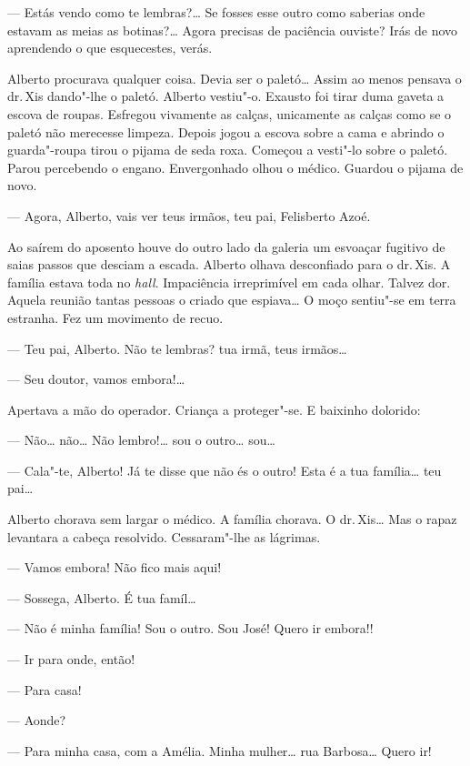 \begin{linenumbers}
--- Estás vendo como te lembras?\ldots{} Se fosses esse outro como saberias
onde estavam as meias as botinas?\ldots{} Agora precisas de paciência
ouviste? Irás de novo aprendendo o que esquecestes, verás.

Alberto procurava qualquer coisa. Devia ser o paletó\ldots{} Assim ao menos
pensava o dr.\,Xis dando"-lhe o paletó. Alberto vestiu"-o. Exausto foi
tirar duma gaveta a escova de roupas. Esfregou vivamente as calças,
unicamente as calças como se o paletó não merecesse limpeza. Depois
jogou a escova sobre a cama e abrindo o guarda"-roupa tirou o pijama de
seda roxa. Começou a vesti"-lo sobre o paletó. Parou percebendo o engano.
Envergonhado olhou o médico. Guardou o pijama de novo.

--- Agora, Alberto, vais ver teus irmãos, teu pai, Felisberto Azoé.

Ao saírem do aposento houve do outro lado da galeria um esvoaçar
fugitivo de saias passos que desciam a escada. Alberto olhava
desconfiado para o dr.\,Xis. A família estava toda no \emph{hall}.
Impaciência irreprimível em cada olhar. Talvez dor. Aquela reunião
tantas pessoas o criado que espiava\ldots{} O moço sentiu"-se em terra
estranha. Fez um movimento de recuo.

--- Teu pai, Alberto. Não te lembras? tua irmã, teus irmãos\ldots{}

--- Seu doutor, vamos embora!\ldots{}

Apertava a mão do operador. Criança a proteger"-se. E baixinho dolorido:

--- Não\ldots{} não\ldots{} Não lembro!\ldots{} sou o outro\ldots{} sou\ldots{}

--- Cala"-te, Alberto! Já te disse que não és o outro! Esta é a tua
família\ldots{} teu pai\ldots{}

Alberto chorava sem largar o médico. A família chorava. O dr.\,Xis\ldots{} Mas
o rapaz levantara a cabeça resolvido. Cessaram"-lhe as lágrimas.

--- Vamos embora! Não fico mais aqui!

--- Sossega, Alberto. É tua famíl\ldots{}

--- Não é minha família! Sou o outro. Sou José! Quero ir embora!!

--- Ir para onde, então!

--- Para casa!

--- Aonde?

--- Para minha casa, com a Amélia. Minha mulher\ldots{} rua Barbosa\ldots{} Quero
ir!


\end{linenumbers}
